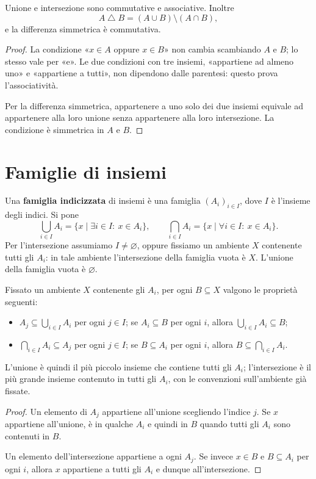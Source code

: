 \begin{proposizione}
Unione e intersezione sono commutative e associative. Inoltre
\[
A\mathbin\triangle B=(A\cup B)\setminus(A\cap B),
\]
e la differenza simmetrica è commutativa.
\end{proposizione}
\begin{proof}
La condizione «$x\in A$ oppure $x\in B$» non cambia scambiando $A$ e $B$; lo stesso vale per «e». Le due condizioni con tre insiemi, «appartiene ad almeno uno» e «appartiene a tutti», non dipendono dalle parentesi: questo prova l'associatività.

Per la differenza simmetrica, appartenere a uno solo dei due insiemi equivale ad appartenere alla loro unione senza appartenere alla loro intersezione. La condizione è simmetrica in $A$ e $B$.
\end{proof}

\section{Famiglie di insiemi}
\begin{definizione}
Una \textbf{famiglia indicizzata} di insiemi è una famiglia $(A_i)_{i\in I}$, dove $I$ è l'insieme degli indici. Si pone
\[
\bigcup_{i\in I}A_i=\{x\mid \exists i\in I:\ x\in A_i\},
\qquad
\bigcap_{i\in I}A_i=\{x\mid \forall i\in I:\ x\in A_i\}.
\]
Per l'intersezione assumiamo $I\ne\varnothing$, oppure fissiamo un ambiente $X$ contenente tutti gli $A_i$: in tale ambiente l'intersezione della famiglia vuota è $X$. L'unione della famiglia vuota è $\varnothing$.
\end{definizione}

\begin{proposizione}
Fissato un ambiente $X$ contenente gli $A_i$, per ogni $B\subseteq X$ valgono le proprietà seguenti:
\begin{itemize}
  \item $A_j\subseteq\bigcup_{i\in I}A_i$ per ogni $j\in I$; se $A_i\subseteq B$ per ogni $i$, allora $\bigcup_{i\in I}A_i\subseteq B$;
  \item $\bigcap_{i\in I}A_i\subseteq A_j$ per ogni $j\in I$; se $B\subseteq A_i$ per ogni $i$, allora $B\subseteq\bigcap_{i\in I}A_i$.
\end{itemize}
L'unione è quindi il più piccolo insieme che contiene tutti gli $A_i$; l'intersezione è il più grande insieme contenuto in tutti gli $A_i$, con le convenzioni sull'ambiente già fissate.
\end{proposizione}
\begin{proof}
Un elemento di $A_j$ appartiene all'unione scegliendo l'indice $j$. Se $x$ appartiene all'unione, è in qualche $A_i$ e quindi in $B$ quando tutti gli $A_i$ sono contenuti in $B$.

Un elemento dell'intersezione appartiene a ogni $A_j$. Se invece $x\in B$ e $B\subseteq A_i$ per ogni $i$, allora $x$ appartiene a tutti gli $A_i$ e dunque all'intersezione.
\end{proof}

